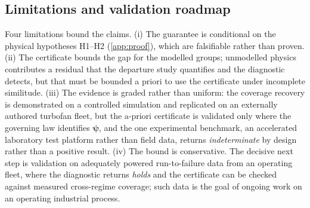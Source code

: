 \subsection{Limitations and validation roadmap}\label{sec:disc-limits}
Four limitations bound the claims. (i) The guarantee is conditional on the physical hypotheses
H1--H2 (\ref{app:proof}), which are falsifiable rather than proven. (ii) The certificate bounds the
gap for the modelled groups; unmodelled physics contributes a residual that the departure study
quantifies and the diagnostic detects, but that must be bounded a priori to use the certificate under
incomplete similitude. (iii) The evidence is graded rather than uniform: the coverage recovery is
demonstrated on a controlled simulation and replicated on an externally authored turbofan fleet,
but the a-priori certificate is validated only where the governing law identifies
$\boldsymbol\psi$, and the one experimental benchmark, an accelerated laboratory test platform
rather than field data, returns \emph{indeterminate} by design rather than a positive result.
(iv) The bound is conservative.
The decisive next step is validation on adequately powered run-to-failure data from an operating
fleet, where the diagnostic returns \emph{holds} and the certificate can be checked against
measured cross-regime coverage; such data is the goal of ongoing work on an operating industrial
process.
